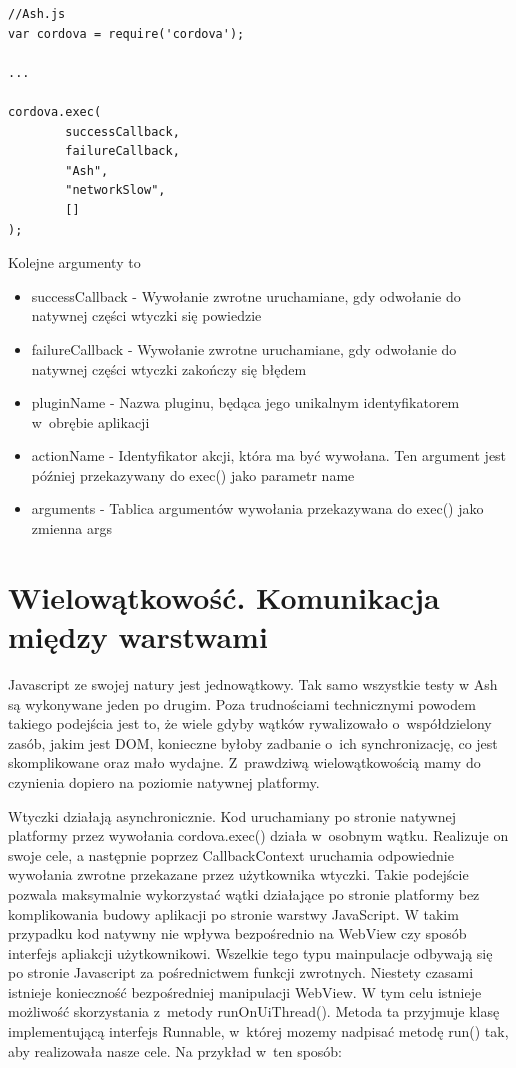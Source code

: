 \documentclass[brudnopis]{xmgr}
\begin{document}
\begin{lstlisting}
//Ash.js
var cordova = require('cordova');

...

cordova.exec( 
        successCallback,
        failureCallback, 
        "Ash", 
        "networkSlow", 
        []
);
\end{lstlisting}

Kolejne argumenty to
\begin{itemize}
  \item successCallback - Wywołanie zwrotne uruchamiane, gdy odwołanie do natywnej części wtyczki się powiedzie
  \item failureCallback - Wywołanie zwrotne uruchamiane, gdy odwołanie do natywnej części wtyczki zakończy się błędem
  \item pluginName - Nazwa pluginu, będąca jego unikalnym identyfikatorem w~obrębie aplikacji
  \item actionName - Identyfikator akcji, która ma być wywołana. Ten argument jest później przekazywany do exec() jako parametr name 
\item arguments - Tablica argumentów wywołania przekazywana do exec() jako zmienna args 
\end{itemize}

\section{Wielowątkowość. Komunikacja między warstwami}

Javascript ze swojej natury jest jednowątkowy. Tak samo wszystkie testy w Ash są wykonywane jeden po drugim. Poza trudnościami technicznymi powodem takiego podejścia jest to, że wiele gdyby wątków rywalizowało o~współdzielony zasób, jakim jest DOM, konieczne byłoby zadbanie o~ich synchronizację, co jest skomplikowane oraz mało wydajne. Z~prawdziwą wielowątkowością mamy do czynienia dopiero na poziomie natywnej platformy.

Wtyczki działają asynchronicznie. Kod uruchamiany po stronie natywnej platformy przez wywołania cordova.exec() działa w~osobnym wątku. Realizuje on swoje cele, a następnie poprzez CallbackContext uruchamia odpowiednie wywołania zwrotne przekazane przez użytkownika wtyczki. Takie podejście pozwala maksymalnie wykorzystać wątki działające po stronie platformy bez komplikowania budowy aplikacji po stronie warstwy JavaScript. W takim przypadku kod natywny nie wpływa bezpośrednio na WebView czy sposób interfejs apliakcji użytkownikowi. Wszelkie tego typu mainpulacje odbywają się po stronie Javascript za pośrednictwem funkcji zwrotnych. Niestety czasami istnieje konieczność bezpośredniej manipulacji WebView. W tym celu istnieje możliwość skorzystania z~metody runOnUiThread(). Metoda ta przyjmuje klasę implementującą interfejs Runnable, w~której mozemy nadpisać metodę run() tak, aby realizowała nasze cele. Na przykład w~ten sposób:
\end{document}

